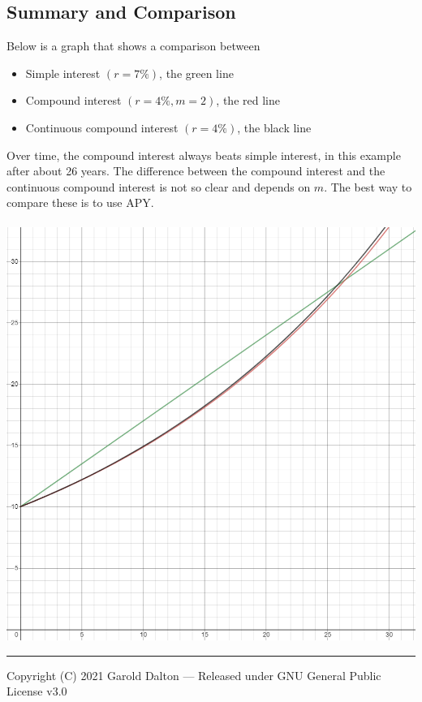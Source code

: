 \documentclass[14pt]{extarticle}
\begin{document}
\subsection{Summary and Comparison}
Below is a graph that shows a comparison between 
\begin{itemize}
	\item Simple interest $(r=7\%)$, the green line
	\item Compound interest $(r= 4\%, m = 2)$, the red line
	\item Continuous compound interest $(r=4\%)$, the black line
\end{itemize} 
Over time, the compound interest always beats simple interest, in this example after about 26 years. The difference between the compound interest and the continuous compound interest is not so clear and depends on $m$. The best way to compare these is to use APY.
\\\\
\includegraphics[width=0.8\linewidth]{3-1}

\noindent\rule{\textwidth}{1pt}
{\footnotesize Copyright (C) 2021 Garold Dalton --- Released under GNU General Public License v3.0}
\end{document}
